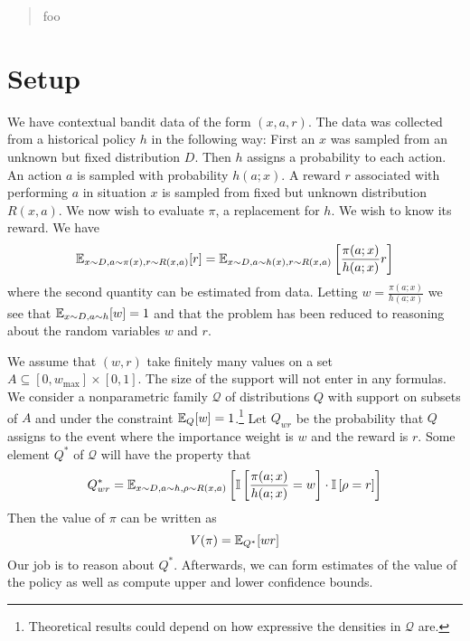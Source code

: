 \begin{abstract}
foo 
\end{abstract}

\section{Setup}
We have contextual bandit data of the form $(x,a,r)$. 
The data was collected from a historical policy $h$ in the following way:
First an $x$ was sampled from an unknown but fixed distribution $D$. 
Then $h$ assigns a probability to each action. 
An action $a$ is sampled with probability $h(a;x)$.
A reward $r$ associated with performing $a$ in
situation $x$ is sampled from fixed but unknown distribution $R(x,a)$. 
We now wish to evaluate $\pi$, 
a replacement for $h$. We wish to know 
its reward. We have
\[
\mathbb{E}_{x\sim D,a\sim\pi(x),r\sim R(x,a)}[r]
=
\mathbb{E}_{x\sim D,a\sim h(x),r\sim R(x,a)}\left[\frac{\pi(a;x)}{h(a;x)}r\right]
\]
where the second quantity can be estimated from data. 
Letting $w=\frac{\pi(a;x)}{h(a;x)}$ we see that 
$\mathbb{E}_{x\sim D,a\sim h}[w]=1$ and that the problem 
has been reduced to reasoning about the random variables $w$ and $r$.

We assume that $(w,r)$ take finitely many values on a set
$A\subseteq [0,w_{\max}]\times [0,1]$. The size of the support will 
not enter in any formulas.
We consider a 
nonparametric family $\mathcal{Q}$ of distributions  $Q$
with support on subsets of $A$ and under the 
constraint $\mathbb{E}_Q[w]=1$.\footnote{
Theoretical results could depend on how 
expressive the densities in $\mathcal{Q}$ are.
} Let $Q_{wr}$ be 
the probability that $Q$ assigns to the event
where the importance weight is $w$ and the
reward is $r$. Some element $Q^*$ 
of $\mathcal{Q}$ will have the property that
\[
Q^*_{wr}=\mathbb{E}_{x\sim D,a\sim h,\rho\sim R(x,a)}
\left[
\mathbb{I}\left[\frac{\pi(a;x)}{h(a;x)}=w\right]\cdot
\mathbb{I}\left[\rho=r\right]
\right]
\]
Then the value of $\pi$ can be written as
\[
V(\pi)=\mathbb{E}_{Q^*}[wr]
\]
Our job is to reason about $Q^*$.
Afterwards, we can form estimates of the value 
of the policy as well as compute upper and lower
confidence bounds.

